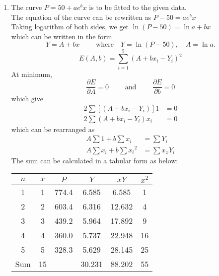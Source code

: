 \documentclass[12pt,class=book,crop=false]{standalone}
\begin{document}
\begin{soln}
	\begin{enumerate}[label=(\alph*)]
		\item The curve $ P=50+ae^bx $ is to be fitted to the given data.\\
		      The equation of the curve can be rewritten as $ P-50=ae^bx $\\
		      Taking logarithm of both sides, we get $ \ln ( P-50)=\ln a+bx $\\
		      which can be written in the form
		      \[
			      Y=A+bx\qquad \text{ where}\quad Y=\ln (P-50),\quad A=\ln a.
		      \]
		      \[
			      E(A,b)=\sum_{i=1}^5 (A+bx_i-Y_i )^2
		      \]
		      At minimum,
		      \[
			      \frac{\partial E}{\partial A}=0\qquad\text{ and }\qquad\frac{\partial E}{\partial b}=0
		      \]
		      which give
		      \begin{align*}
			      2\sum[(A+bx_i-Y_i)]1  & =0 \\
			      2\sum (A+bx_i-Y_i)x_i & =0
		      \end{align*}
		      which can be rearranged as
		      \begin{align*}
			      A\sum 1+b\sum x_i          & =\sum Y_i     \\
			      A\sum x_i + b \sum {x_i}^2 & =\sum x_x Y_i
		      \end{align*}
		      The sum can be calculated in a tabular form as below:
		      \begin{table}
			      \centering
			      \begin{tabular}{ccS[table-format=3.2]*{2}{S[table-format=3.3]}c}
				      \toprule
				      $ n $ & $ x $ &  &   &  & $ x^2 $ \\     & 1     & 774.4 & 6.585  & 6.585  & 1       \\
				      2     & 2     & 603.4 & 6.316  & 12.632 & 4       \\
				      3     & 3     & 439.2 & 5.964  & 17.892 & 9       \\
				      4     & 4     & 360.0 & 5.737  & 22.948 & 16      \\
				      5     & 5     & 328.3 & 5.629  & 28.145 & 25      \\\midrule
				      Sum   & 15    &       & 30.231 & 88.202 & 55      \\\bottomrule
			      \end{tabular}
		      \end{table}

\end{enumerate}
\end{soln}
\end{document}

